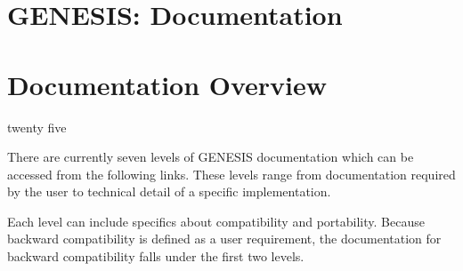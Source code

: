 \documentclass[12pt]{article}
\begin{document}
\section*{GENESIS: Documentation}

\section*{Documentation Overview}

twenty five

There are currently seven levels of GENESIS documentation which can be
accessed from the following links.  These levels range from documentation required by the user to technical detail of a specific implementation.

Each level can include specifics about compatibility and
portability.  Because backward compatibility is
defined as a user requirement, the documentation for backward
compatibility falls under the first two levels.
\end{document}
